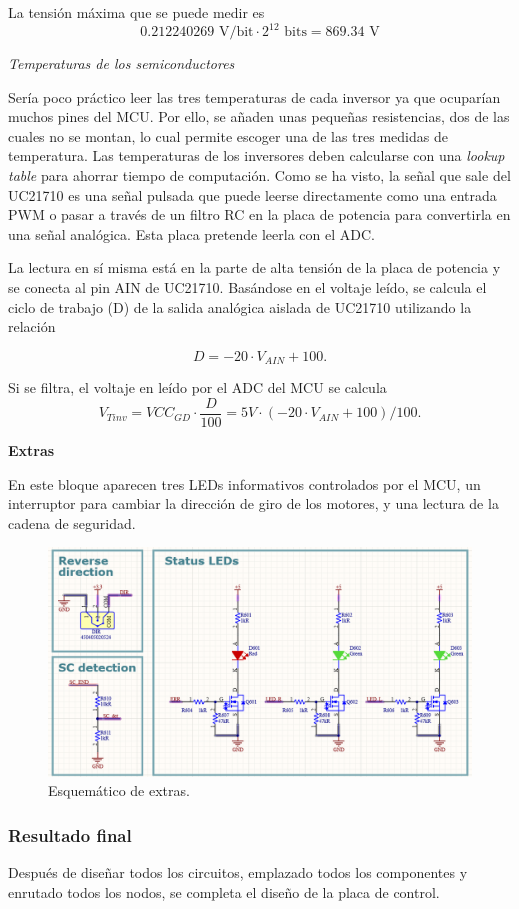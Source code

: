 La tensión máxima que se puede medir es
\[ 0.212240269 \text{ V/bit} \cdot 2^{12} \text{ bits} = 869.34 \text{ V} \]

\textit{Temperaturas de los semiconductores}

Sería poco práctico leer las tres temperaturas de cada inversor ya que ocuparían muchos pines del MCU. Por ello, se añaden unas pequeñas resistencias, dos de las cuales no se montan, lo cual permite escoger una de las tres medidas de temperatura. Las temperaturas de los inversores deben calcularse con una \textit{lookup table} para ahorrar tiempo de computación. Como se ha visto, la señal que sale del UC21710 es una señal pulsada que puede leerse directamente como una entrada PWM o pasar a través de un filtro RC en la placa de potencia para convertirla en una señal analógica. Esta placa pretende leerla con el ADC.

La lectura en sí misma está en la parte de alta tensión de la placa de potencia y se conecta al pin AIN de UC21710. Basándose en el voltaje leído, se calcula el ciclo de trabajo (D) de la salida analógica aislada de UC21710 utilizando la relación

\[ D = -20 \cdot V_{AIN} + 100 .\]

Si se filtra, el voltaje en leído por el ADC del MCU se calcula
\[ V_{Tinv} = VCC_{GD} \cdot \frac{D}{100} = 5V \cdot \left(-20 \cdot V_{AIN} + 100\right)/100 .\]


\textbf{Extras}

En este bloque aparecen tres LEDs informativos controlados por el MCU, un interruptor para cambiar la dirección de giro de los motores, y una lectura de la cadena de seguridad.

\begin{figure}[H]
	\centering
	\includegraphics[width=0.7\linewidth]{fig/schEXTRAScontrol}
	\caption{Esquemático de extras.}
\end{figure}


\subsubsection{Resultado final}
Después de diseñar todos los circuitos, emplazado todos los componentes y enrutado todos los nodos, se completa el diseño de la placa de control.



